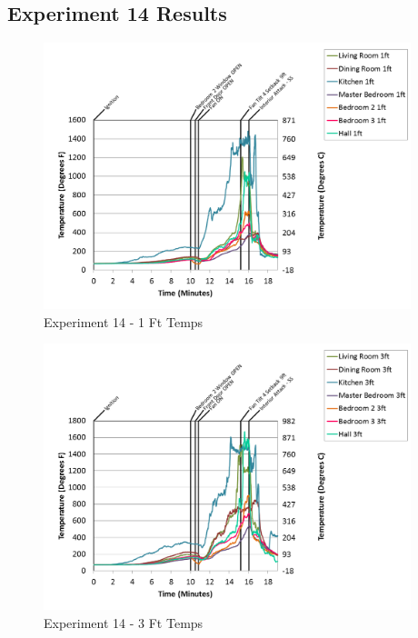 \documentclass{article}
\begin{document}
\begin{appendices}
\clearpage
\clearpage		\large
\subsection{Experiment 14 Results} \label{App:Exp14Results} 

\begin{figure}[h!]
	\centering
	\includegraphics[height=3.05in]{0_Images/Results_Charts/Exp_14_Charts/1FtTemps.png}
	\caption{Experiment 14 - 1 Ft Temps}
\end{figure}


\begin{figure}[h!]
	\centering
	\includegraphics[height=3.05in]{0_Images/Results_Charts/Exp_14_Charts/3FtTemps.png}
	\caption{Experiment 14 - 3 Ft Temps}
\end{figure}

\clearpage


\end{appendices}
\end{document}
